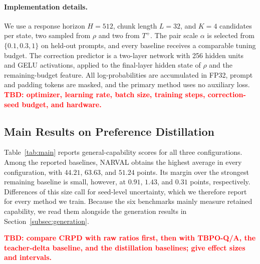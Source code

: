 \documentclass[pdflatex,sn-mathphys-num,review]{sn-jnl}
\theoremstyle{thmstyleone}
\theoremstyle{thmstyletwo}
\theoremstyle{thmstylethree}
\providecommand{\Tp}{T^{+}}
\newcommand{\tbd}[1][]{\textcolor{red}{\textbf{TBD#1}}}
\begin{document}
\paragraph{Implementation details.}
We use a response horizon $H=512$, chunk length $L=32$, and $K=4$ candidates per state, two sampled from $\rho$ and two from $\Tp$. The pair scale $\alpha$ is selected from $\{0.1,0.3,1\}$ on held-out prompts, and every baseline receives a comparable tuning budget. The correction predictor is a two-layer network with 256 hidden units and GELU activations, applied to the final-layer hidden state of $\rho$ and the remaining-budget feature. All log-probabilities are accumulated in FP32, prompt and padding tokens are masked, and the primary method uses no auxiliary loss. \tbd[: optimizer, learning rate, batch size, training steps, correction-seed budget, and hardware.]

\subsection{Main Results on Preference Distillation}
\label{subsec:main_results}

Table~\ref{tab:main} reports general-capability scores for all three configurations. Among the reported baselines, NARVAL obtains the highest average in every configuration, with $44.21$, $63.63$, and $51.24$ points. Its margin over the strongest remaining baseline is small, however, at $0.91$, $1.43$, and $0.31$ points, respectively. Differences of this size call for seed-level uncertainty, which we therefore report for every method we train. Because the six benchmarks mainly measure retained capability, we read them alongside the generation results in Section~\ref{subsec:generation}.

\tbd[: compare CRPD with raw ratios first, then with TBPO-Q/A, the teacher-delta baseline, and the distillation baselines; give effect sizes and intervals.]
\end{document}
